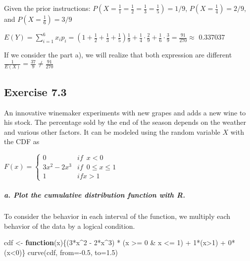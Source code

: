 \documentclass[
]{article}
\newenvironment{Shaded}{\begin{snugshade}}{\end{snugshade}}
\newcommand{\AttributeTok}[1]{\textcolor[rgb]{0.77,0.63,0.00}{#1}}
\newcommand{\ControlFlowTok}[1]{\textcolor[rgb]{0.13,0.29,0.53}{\textbf{#1}}}
\newcommand{\DecValTok}[1]{\textcolor[rgb]{0.00,0.00,0.81}{#1}}
\newcommand{\FloatTok}[1]{\textcolor[rgb]{0.00,0.00,0.81}{#1}}
\newcommand{\FunctionTok}[1]{\textcolor[rgb]{0.00,0.00,0.00}{#1}}
\newcommand{\NormalTok}[1]{#1}
\newcommand{\OtherTok}[1]{\textcolor[rgb]{0.56,0.35,0.01}{#1}}
\newcommand{\SpecialCharTok}[1]{\textcolor[rgb]{0.00,0.00,0.00}{#1}}
\begin{document}
Given the prior instructions:
\(P(X = \frac{1}{1} = \frac{1}{2} = \frac{1}{3} = \frac{1}{5}) = 1/9\),
\(P(X = \frac{1}{4}) = 2/9\), and \(P(X = \frac{1}{6}) = 3/9\)

\(E(Y) = \sum\limits_{i=1}^6x_ip_i = (1 + \frac{1}{2} + \frac{1}{3} +\frac{1}{5})\frac{1}{9} + \frac{1}{4} \cdot \frac{2}{9} + \frac{1}{6} \cdot \frac{3}{9} = \frac{91}{270} \approx\)
0.337037

If we consider the part a), we will realize that both expression are
different \(\frac{1}{E(X)} = \frac{37}{9} \neq \frac{91}{270}\)

\hypertarget{exercise-7.3}{%
\subsection{Exercise 7.3}\label{exercise-7.3}}

An innovative winemaker experiments with new grapes and adds a new wine
to his stock. The percentage sold by the end of the season depends on
the weather and various other factors. It can be modeled using the
random variable \(X\) with the CDF as

\(F(x) = \left\{ \begin{array}{ll} 0 & if \enspace x < 0 \\ 3x^2 - 2x^3 & if \enspace 0 \leq x \leq 1 \\ 1 & if x > 1 \end{array} \right.\)

\hypertarget{a.-plot-the-cumulative-distribution-function-with-r.}{%
\subparagraph{a. Plot the cumulative distribution function with
R.}\label{a.-plot-the-cumulative-distribution-function-with-r.}}

To consider the behavior in each interval of the function, we multiply
each behavior of the data by a logical condition.

\begin{Shaded}
\begin{Highlighting}[]
\NormalTok{cdf }\OtherTok{\textless{}{-}} \ControlFlowTok{function}\NormalTok{(x)\{(}\DecValTok{3}\SpecialCharTok{*}\NormalTok{x}\SpecialCharTok{\^{}}\DecValTok{2} \SpecialCharTok{{-}} \DecValTok{2}\SpecialCharTok{*}\NormalTok{x}\SpecialCharTok{\^{}}\DecValTok{3}\NormalTok{) }\SpecialCharTok{*}\NormalTok{ (x }\SpecialCharTok{\textgreater{}=} \DecValTok{0} \SpecialCharTok{\&}\NormalTok{ x }\SpecialCharTok{\textless{}=} \DecValTok{1}\NormalTok{) }\SpecialCharTok{+} \DecValTok{1}\SpecialCharTok{*}\NormalTok{(x}\SpecialCharTok{\textgreater{}}\DecValTok{1}\NormalTok{) }\SpecialCharTok{+} \DecValTok{0}\SpecialCharTok{*}\NormalTok{(x}\SpecialCharTok{\textless{}}\DecValTok{0}\NormalTok{)\}}
\FunctionTok{curve}\NormalTok{(cdf, }\AttributeTok{from=}\SpecialCharTok{{-}}\FloatTok{0.5}\NormalTok{, }\AttributeTok{to=}\FloatTok{1.5}\NormalTok{)}
\end{Highlighting}
\end{Shaded}
\end{document}
